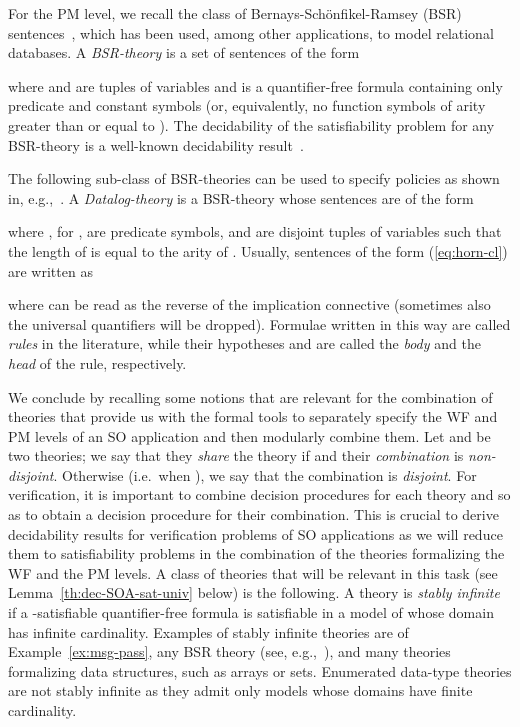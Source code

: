 \documentclass[conference]{IEEEtran}
\begin{document}
For the PM level, we recall the class of Bernays-Sch\"onfikel-Ramsey
(BSR) sentences~\cite{Boerger97}, which has been used, among other applications, to
model relational databases.  A \emph{BSR-theory} is a
set of sentences of the form

where  and  are tuples of variables and
 is a quantifier-free formula containing only predicate and
constant symbols (or, equivalently, no function symbols of arity
greater than or equal to ).  The decidability of the satisfiability
problem for any BSR-theory is a well-known decidability
result~\cite{Boerger97}.

The following sub-class of BSR-theories can be used to specify
policies as shown in, e.g.,~\cite{SPKI-SDSI-in-FOL}.  A
\emph{Datalog-theory} is a BSR-theory whose sentences are of the form

where , for , are predicate symbols,
and  are disjoint tuples of variables such
that the length of  is equal to the arity of .
Usually, sentences of the form (\ref{eq:horn-cl}) are written as 

where  can be read as the reverse of the implication
connective (sometimes also the universal quantifiers will be dropped).
Formulae written in this way are called \emph{rules} in the
literature, while their hypotheses and  are called
the \emph{body} and the \emph{head} of the rule, respectively.

We conclude by recalling some notions that are relevant for the
combination of theories that 
provide us with the formal tools to separately specify the WF and PM
levels of an SO application and then modularly combine them.  Let
 and  be two theories; we say that they \emph{share} the
theory  if  and their
\emph{combination}  is \emph{non-disjoint}.  Otherwise
(i.e.\ when ), we say that the {combination}  is \emph{disjoint}.  For verification, it is important to combine
decision procedures for each theory  and  so as to obtain a
decision procedure for their combination.  This is crucial to 
derive decidability results for verification problems of SO
applications as we will reduce them to satisfiability problems in the
combination of the theories formalizing the WF and the PM levels.  A
class of theories that will be relevant in this task (see
Lemma~\ref{th:dec-SOA-sat-univ} below) is the following.  A theory 
is \emph{stably infinite} if a -satisfiable quantifier-free formula
is satisfiable in a model of  whose domain has infinite
cardinality.  Examples of stably infinite theories are
 of Example~\ref{ex:msg-pass}, any BSR
theory (see, e.g.,~\cite{tinelli-zarba}), and many theories
formalizing data structures, such as arrays or sets.  Enumerated
data-type theories are not stably infinite as they admit only models
whose domains have finite cardinality.
\end{document}
